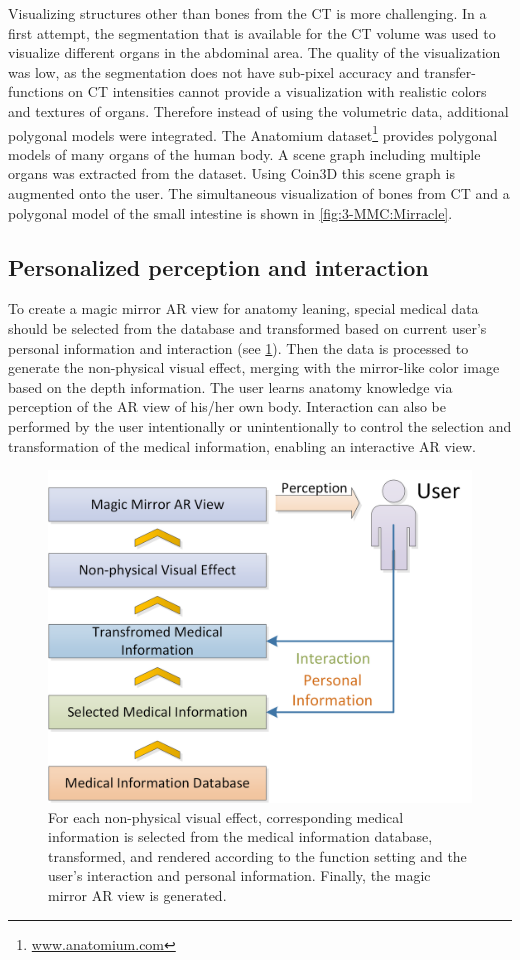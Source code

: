{Visualizing structures other than bones from the CT is more challenging. In a first attempt, the segmentation that is available for the CT volume was used to visualize different organs in the abdominal area. The quality of the visualization was low, as the segmentation does not have sub-pixel accuracy and transfer-functions on CT intensities cannot provide a visualization with realistic colors and textures of organs. Therefore instead of using the volumetric data, additional polygonal models were integrated. The Anatomium dataset\footnote{\url{www.anatomium.com}} provides polygonal models of many organs of the human body. A scene graph including multiple organs was extracted from the dataset. Using Coin3D this scene graph is augmented onto the user. The simultaneous visualization of bones from CT and a polygonal model of the small intestine is shown in \figurename{\ref{fig:3-MMC:Mirracle}}.
	
\subsection{Personalized perception and interaction} \label{sec:3:MMCInteraction}
To create a magic mirror AR view for anatomy leaning, special medical data should be selected from the database and transformed based on current user's personal information and interaction (see \figurename{\ref{fig:3-MMC:MedicalInfoFlow}}). Then the data is processed to generate the non-physical visual effect, merging with the mirror-like color image based on the depth information. The user learns anatomy knowledge via perception of the AR view of his/her own body. Interaction can also be performed by the user intentionally or unintentionally to control the  selection and transformation of the medical information, enabling an interactive AR view.
\begin{figure}
	\centering
	\includegraphics[width=0.7\linewidth]{figures/3-MMC/MedicalInfoFlow}
	\caption[Medical Information Flow]{For each non-physical visual effect, corresponding medical information is selected from the medical information database, transformed, and rendered according to the function setting and the user's interaction and personal information. Finally, the magic mirror AR view is generated.}
	\label{fig:3-MMC:MedicalInfoFlow}
\end{figure}

}
